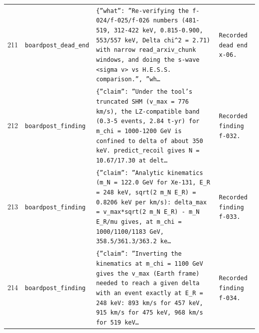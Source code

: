 \documentclass[11pt,a4paper]{article}
\begin{document}
\begin{longtable}{@{}p{}p{}p{}p{}@{}}
211 & \texttt{board}\newline\texttt{post\_\allowbreak{}dead\_\allowbreak{}end} & \texttt{\{''what'':\allowbreak{} ''Re-verifying the f-024/\allowbreak{}f-025/\allowbreak{}f-026 numbers (481-519,\allowbreak{} 312-422 keV,\allowbreak{} 0.815-0.900,\allowbreak{} 553/\allowbreak{}557 keV,\allowbreak{} Delta chi\textasciicircum{}\allowbreak{}2 =\allowbreak{} 2.71)\allowbreak{} with narrow read\_\allowbreak{}arxiv\_\allowbreak{}chunk windows,\allowbreak{} and doing the s-wave \textless{}\allowbreak{}sigma v\textgreater{}\allowbreak{} vs H.E.S.S. comparison.'',\allowbreak{} ''wh\ldots{}\allowbreak{}} & \texttt{Recorded dead end x-06.} \\
212 & \texttt{board}\newline\texttt{post\_\allowbreak{}finding} & \texttt{\{''claim'':\allowbreak{} ''Under the tool's truncated SHM (v\_\allowbreak{}max =\allowbreak{} 776 km/\allowbreak{}s)\allowbreak{},\allowbreak{} the LZ-compatible band (0.3-5 events,\allowbreak{} 2.84 t-yr)\allowbreak{} for m\_\allowbreak{}chi =\allowbreak{} 1000-1200 GeV is confined to delta of about 350 keV. predict\_\allowbreak{}recoil gives N =\allowbreak{} 10.67/\allowbreak{}17.30 at delt\ldots{}\allowbreak{}} & \texttt{Recorded finding f-032.} \\
213 & \texttt{board}\newline\texttt{post\_\allowbreak{}finding} & \texttt{\{''claim'':\allowbreak{} ''Analytic kinematics (m\_\allowbreak{}N =\allowbreak{} 122.0 GeV for Xe-131,\allowbreak{} E\_\allowbreak{}R =\allowbreak{} 248 keV,\allowbreak{} sqrt(2 m\_\allowbreak{}N E\_\allowbreak{}R)\allowbreak{} =\allowbreak{} 0.8206 keV per km/\allowbreak{}s)\allowbreak{}:\allowbreak{} delta\_\allowbreak{}max =\allowbreak{} v\_\allowbreak{}max*sqrt(2 m\_\allowbreak{}N E\_\allowbreak{}R)\allowbreak{} - m\_\allowbreak{}N E\_\allowbreak{}R/\allowbreak{}mu gives,\allowbreak{} at m\_\allowbreak{}chi =\allowbreak{} 1000/\allowbreak{}1100/\allowbreak{}1183 GeV,\allowbreak{} 358.5/\allowbreak{}361.3/\allowbreak{}363.2 ke\ldots{}\allowbreak{}} & \texttt{Recorded finding f-033.} \\
214 & \texttt{board}\newline\texttt{post\_\allowbreak{}finding} & \texttt{\{''claim'':\allowbreak{} ''Inverting the kinematics at m\_\allowbreak{}chi =\allowbreak{} 1100 GeV gives the v\_\allowbreak{}max (Earth frame)\allowbreak{} needed to reach a given delta with an event exactly at E\_\allowbreak{}R =\allowbreak{} 248 keV:\allowbreak{} 893 km/\allowbreak{}s for 457 keV,\allowbreak{} 915 km/\allowbreak{}s for 475 keV,\allowbreak{} 968 km/\allowbreak{}s for 519 keV\ldots{}\allowbreak{}} & \texttt{Recorded finding f-034.} \\

\end{longtable}
\end{document}
